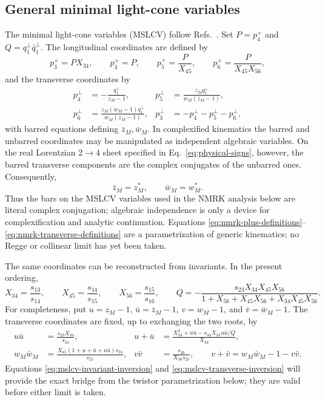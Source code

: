 \documentclass[11pt]{article}
\begin{document}
\subsection{General minimal light-cone variables}

The minimal light-cone variables (MSLCV) follow
Refs.~\cite{Byrne:2022wdr,Byrne:2025phh}.  Set \(P=p_4^+\) and
\(Q=q_1^\perp\bar q_1^\perp\).  The longitudinal coordinates are defined by
\begin{equation}
p_3^+=PX_{34},\qquad p_4^+=P,\qquad
p_5^+=\frac{P}{X_{45}},\qquad
p_6^+=\frac{P}{X_{45}X_{56}},
\label{eq:nmrk-plus-definitions}
\end{equation}
and the transverse coordinates by
\begin{align}
p_4^\perp&=-\frac{q_1^\perp}{z_M-1},&
p_5^\perp&=\frac{z_Mq_1^\perp}{w_M(z_M-1)},\nonumber\\
p_6^\perp&=\frac{z_M(w_M-1)q_1^\perp}{w_M(z_M-1)},&
p_3^\perp&=-p_4^\perp-p_5^\perp-p_6^\perp,
\label{eq:nmrk-transverse-definitions}
\end{align}
with barred equations defining \(\bar z_M,\bar w_M\).  In complexified
kinematics the barred and unbarred coordinates may be manipulated as
independent algebraic variables.  On the real Lorentzian \(2\to4\) sheet
specified in Eq.~\eqref{eq:physical-signs}, however, the barred transverse
components are the complex conjugates of the unbarred ones.  Consequently,
\begin{equation}
 \bar z_M=z_M^*,\qquad \bar w_M=w_M^*.
 \label{eq:mslcv-reality}
\end{equation}
Thus the bars on the MSLCV variables used in the NMRK analysis below are
literal complex conjugation; algebraic independence is only a device for
complexification and analytic continuation.  Equations
\eqref{eq:nmrk-plus-definitions}--\eqref{eq:nmrk-transverse-definitions} are
a parametrization of generic kinematics; no Regge or collinear limit has yet
been taken.

The same coordinates can be reconstructed from invariants.  In the present
ordering,
\begin{equation}
 X_{34}=\frac{s_{13}}{s_{14}},\qquad
 X_{45}=\frac{s_{14}}{s_{15}},\qquad
 X_{56}=\frac{s_{15}}{s_{16}},\qquad
 Q=-\frac{s_{23}X_{34}X_{45}X_{56}}
 {1+X_{56}+X_{45}X_{56}+X_{34}X_{45}X_{56}}.
 \label{eq:mslcv-invariant-inversion}
\end{equation}
For completeness, put
\(u=z_M-1\), \(\bar u=\bar z_M-1\),
\(v=w_M-1\), and \(\bar v=\bar w_M-1\).  The transverse coordinates are
fixed, up to exchanging the two roots, by
\begin{align}
u\bar u&=\frac{s_{23}X_{34}}{s_{24}},&
u+\bar u&=\frac{X_{34}^2+u\bar u-s_{34}X_{34}u\bar u/Q}{X_{34}},
\nonumber\\
w_M\bar w_M&=\frac{X_{45}(1+u+\bar u+u\bar u)s_{24}}{s_{25}},&
v\bar v&=\frac{s_{26}}{X_{56}s_{25}},\qquad
v+\bar v=w_M\bar w_M-1-v\bar v.
\label{eq:mslcv-transverse-inversion}
\end{align}
Equations \eqref{eq:mslcv-invariant-inversion} and
\eqref{eq:mslcv-transverse-inversion} will provide the exact bridge from the
twistor parametrization below; they are valid before either limit is taken.
\end{document}
